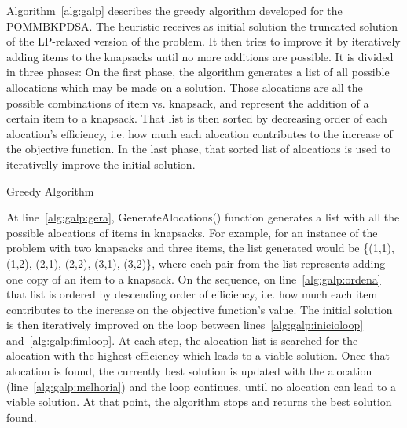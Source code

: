Algorithm~\ref{alg:galp} describes the greedy algorithm developed for the POMMBKPDSA. The heuristic receives as initial solution 
the truncated solution of the LP-relaxed version of the problem. It then tries to improve it by iteratively adding items to the 
knapsacks until no more additions are possible. It is divided in three phases: On the first phase, the algorithm generates a list
of all possible allocations which may be made on a solution. Those alocations are all the possible combinations of item vs. knapsack, 
and represent the addition of a certain item to a knapsack. That list is then sorted by decreasing order of each alocation's efficiency,
i.e. how much each alocation contributes to the increase of the objective function. In the last phase, that sorted list of alocations
is used to iterativelly improve the initial solution.

\begin{algorithm}
  \caption{Greedy Algorithm}
  \label{alg:galp}
\end{algorithm}

At line~\ref{alg:galp:gera}, GenerateAlocations() function generates a list with all the possible alocations of items in knapsacks. 
For example, for an instance of the problem with two knapsacks and three items, the list generated would be \{(1,1), (1,2), (2,1), (2,2), (3,1), (3,2)\},
where each pair from the list represents adding one copy of an item to a knapsack. On the sequence, on line~\ref{alg:galp:ordena} that list is 
ordered by descending order of efficiency, i.e. how much each item contributes to the increase on the objective function's value. The initial solution is 
then iteratively improved on the loop between lines~\ref{alg:galp:inicioloop} 
and~\ref{alg:galp:fimloop}. At each step, the alocation list is searched for the alocation with the highest efficiency which leads to a viable solution.
Once that alocation is found, the currently best solution is updated with the alocation (line~\ref{alg:galp:melhoria}) and the loop continues, until no
alocation can lead to a viable solution. At that point, the algorithm stops and returns the best solution found.

